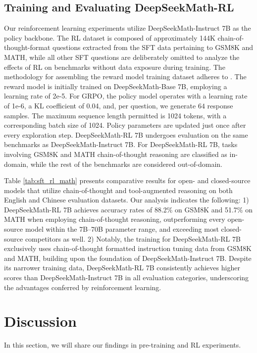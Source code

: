 \begin{itemize}[topsep=0pt]
\begin{itemize}[topsep=0pt]
\subsection{Training and Evaluating DeepSeekMath-RL}

Our reinforcement learning experiments utilize DeepSeekMath-Instruct 7B as the policy backbone. The RL dataset is composed of approximately 144K chain-of-thought-format questions extracted from the SFT data pertaining to GSM8K and MATH, while all other SFT questions are deliberately omitted to analyze the effects of RL on benchmarks without data exposure during training. The methodology for assembling the reward model training dataset adheres to \citep{wang2023math}. The reward model is initially trained on DeepSeekMath-Base 7B, employing a learning rate of 2e-5. For GRPO, the policy model operates with a learning rate of 1e-6, a KL coefficient of 0.04, and, per question, we generate $64$ response samples. The maximum sequence length permitted is 1024 tokens, with a corresponding batch size of 1024. Policy parameters are updated just once after every exploration step. DeepSeekMath-RL 7B undergoes evaluation on the same benchmarks as DeepSeekMath-Instruct 7B. For DeepSeekMath-RL 7B, tasks involving GSM8K and MATH chain-of-thought reasoning are classified as in-domain, while the rest of the benchmarks are considered out-of-domain.

Table \ref{tab:sft_rl_math} presents comparative results for open- and closed-source models that utilize chain-of-thought and tool-augmented reasoning on both English and Chinese evaluation datasets. Our analysis indicates the following: 1) DeepSeekMath-RL 7B achieves accuracy rates of 88.2\% on GSM8K and 51.7\% on MATH when employing chain-of-thought reasoning, outperforming every open-source model within the 7B–70B parameter range, and exceeding most closed-source competitors as well. 2) Notably, the training for DeepSeekMath-RL 7B exclusively uses chain-of-thought formatted instruction tuning data from GSM8K and MATH, building upon the foundation of DeepSeekMath-Instruct 7B. Despite its narrower training data, DeepSeekMath-RL 7B consistently achieves higher scores than DeepSeekMath-Instruct 7B in all evaluation categories, underscoring the advantages conferred by reinforcement learning.

\section{Discussion}
In this section, we will share our findings in pre-training and RL experiments. 


\end{itemize}
\end{itemize}
